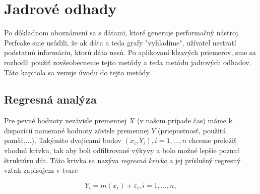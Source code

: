 \chapter{Jadrové odhady}

Po dôkladnom oboznámení sa s dátami, ktoré generuje performačný nástroj Perfcake sme usúdili, že ak dáta a teda grafy "vyhladíme", užívateľ nestratí podstatnú informáciu, ktorú dáta nesú. Po aplikovaní kĺzavých priemerov, sme sa rozhodli použiť zovšeobecnenie tejto metódy a teda metódu jadrových odhadov. Táto kapitola sa venuje úvodu do tejto metódy.
\section{Regresná analýza}
Pre pevné hodnoty nezávisle premennej $X$ (v našom prípade čas)  máme k dispozícií namerané hodnoty závisle premennej $Y$ (priepustnosť, použitá pamäť,...). Takýmito dvojicami bodov $(x_i, Y_i), i = 1,...,n$ chceme preložiť vhodnú krivku, tak aby boli odfiltrované výkyvy a bolo možné lepšie poznať štruktúru dát. Táto krivka sa nazýva \textit{regresná krivka} a jej príslušný regresný vzťah zapisujem v tvare

\begin{equation}
Y_i = m(x_i) + \varepsilon _i, i=1,...,n,
\end{equation}
